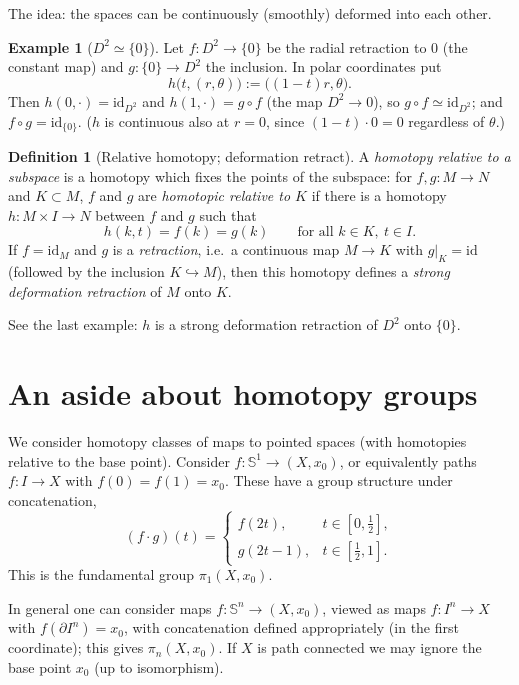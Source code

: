 \documentclass[11pt,openany]{book}
\theoremstyle{plain}
\theoremstyle{definition}
\newtheorem{definition}[theorem]{Definition}
\newtheorem{example}[theorem]{Example}
\theoremstyle{remark}
\newcommand{\added}[1]{{\color{addcol}#1}}
\newcommand{\Sph}{\mathbb{S}}          %
\begin{document}
The idea: the spaces can be continuously (smoothly) deformed into each other.

\begin{example}[$D^2\simeq\{0\}$]
\label{L07:ex:disk}
Let $f\colon D^2\to\{0\}$ be the radial retraction to $0$ (the constant map) and
$g\colon\{0\}\to D^2$ the inclusion. In polar coordinates put
\[
  h\big(t,(r,\theta)\big):=\big((1-t)r,\theta\big).
\]
Then $h(0,\cdot)=\mathrm{id}_{D^2}$ and $h(1,\cdot)=g\circ f$ (the map $D^2\to 0$), so
$g\circ f\simeq\mathrm{id}_{D^2}$; and $f\circ g=\mathrm{id}_{\{0\}}$.
\added{($h$ is continuous also at $r=0$, since $(1-t)\cdot 0=0$ regardless of $\theta$.)}
\end{example}

\begin{definition}[Relative homotopy; deformation retract]
\label{L07:def:relhom}
A \emph{homotopy relative to a subspace} is a homotopy which fixes the points of the
subspace: for $f,g\colon M\to N$ and $K\subset M$, $f$ and $g$ are \emph{homotopic
relative to $K$} if there is a homotopy $h\colon M\times I\to N$ between $f$ and $g$ such
that
\[
  h(k,t)=f(k)=g(k)\qquad\text{for all } k\in K,\ t\in I .
\]
If $f=\mathrm{id}_M$ and $g$ is a \emph{retraction}, i.e.\ a continuous map $M\to K$ with
$g|_K=\mathrm{id}$ \added{(followed by the inclusion $K\hookrightarrow M$)}, then this
homotopy defines a \emph{strong deformation retraction} of $M$ onto $K$.
\end{definition}
See the last example: $h$ is a strong deformation retraction of $D^2$ onto $\{0\}$.

\section{An aside about homotopy groups}
\label{L07:sec:homotopygroups}

We consider homotopy classes of maps to pointed spaces
\added{(with homotopies relative to the base point)}. Consider
$f\colon \Sph^1\to(X,x_0)$, or equivalently paths $f\colon I\to X$ with
$f(0)=f(1)=x_0$. These have a group structure under concatenation,
\[
  (f\cdot g)(t)=\begin{cases} f(2t), & t\in[0,\tfrac12],\\ g(2t-1), & t\in[\tfrac12,1].\end{cases}
\]
This is the fundamental group $\pi_1(X,x_0)$.

In general one can consider maps $f\colon\Sph^n\to(X,x_0)$, viewed as maps
$f\colon I^n\to X$ with $f(\partial I^n)=x_0$, with concatenation defined appropriately
\added{(in the first coordinate)}; this gives $\pi_n(X,x_0)$. If $X$ is path connected we
may ignore the base point $x_0$ \added{(up to isomorphism)}.
\end{document}
